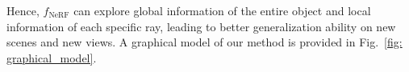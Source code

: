 Hence, $f_{\text{NeRF}}$ can explore global information of the entire object and local information of each specific ray, leading to better generalization ability on new scenes and new views.
A graphical model of our method is provided in Fig.~\ref{fig: graphical_model}. 







